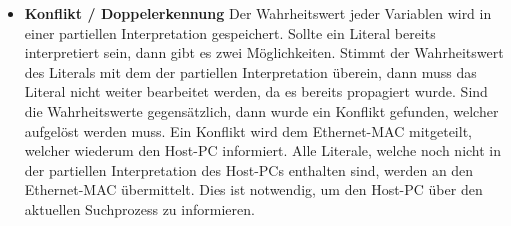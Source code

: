 \begin{itemize}
\item
  \textbf{Konflikt / Doppelerkennung}\newline
  Der Wahrheitswert jeder Variablen wird in einer partiellen Interpretation gespeichert. 
  Sollte ein Literal bereits interpretiert sein, dann gibt es zwei Möglichkeiten. Stimmt
  der Wahrheitswert des Literals mit dem der partiellen Interpretation überein, dann 
  muss das Literal nicht weiter bearbeitet werden, da es bereits propagiert wurde. 
  Sind die Wahrheitswerte gegensätzlich, dann wurde ein Konflikt gefunden, 
  welcher aufgelöst werden muss. Ein Konflikt wird dem Ethernet-MAC
  mitgeteilt, welcher wiederum den Host-PC informiert.
  Alle Literale, welche noch nicht in der partiellen Interpretation 
  des Host-PCs enthalten sind,
  werden an den Ethernet-MAC übermittelt. Dies ist notwendig, um den 
  Host-PC über den aktuellen Suchprozess zu informieren.
\end{itemize}

